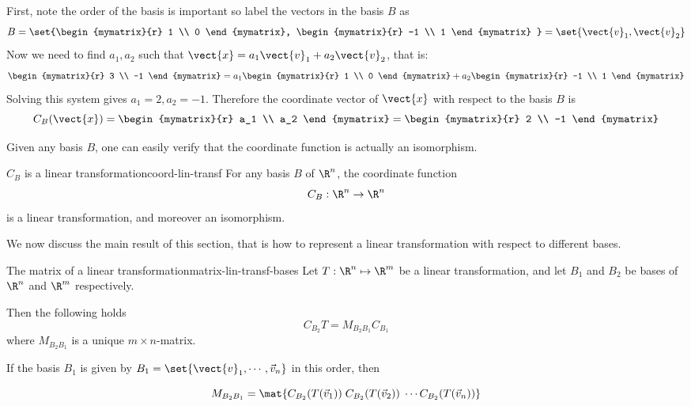 \begin{solution}
First, note the order of the basis is important so label the vectors in the basis $B$ as 
\[
B = \set{\begin{mymatrix}{r}
1 \\
0 
\end{mymatrix}, \begin{mymatrix}{r}
-1 \\
1
\end{mymatrix} } = \set{\vect{v}_1, \vect{v}_2 } \]
Now we need to find $a_1, a_2$ such that $\vect{x} = a_1 \vect{v}_1 + a_2 \vect{v}_2$, that is:
\[
\begin{mymatrix}{r}
3 \\
-1
\end{mymatrix}
=
a_1 
\begin{mymatrix}{r}
1 \\
0 
\end{mymatrix}
+ a_2
\begin{mymatrix}{r}
-1 \\
1 
\end{mymatrix}\]
Solving this system gives $a_1 = 2, a_2 = -1$. Therefore the coordinate vector of $\vect{x}$ with respect to the basis $B$ is 
\[
C_B(\vect{x})
=
\begin{mymatrix}{r}
a_1 \\
a_2 
\end{mymatrix}
= \begin{mymatrix}{r}
2 \\
-1 
\end{mymatrix}
\]
\end{solution}

Given any basis $B$, one can easily verify that the coordinate function is actually an isomorphism. 

\begin{theorem}{$C_B$ is a linear transformation}{coord-lin-transf}
For any basis $B$ of $\R^n$, the coordinate function
\[ C_B: \R^n  \rightarrow \R^n  \]
is a linear transformation, and moreover an isomorphism. 
\end{theorem}

We now discuss the main  result  of this section, that is how
to represent a linear transformation with respect to different
bases.

\begin{theorem}{The matrix of a linear transformation}{matrix-lin-transf-bases}
Let $T: \R^n \mapsto \R^m$ be a linear transformation,
and let $B_1$ and $B_2$ be bases of $\R^{n}$ and
$\R^{m}$ respectively.

Then the following holds
\begin{equation}
C_{B_2} T = M_{B_{2} B_{1}} C_{B_1}   \label{matrix-equation}
\end{equation}
where $M_{B_{2} B_{1}}$  is a unique $m \times n$-matrix.

If the basis $B_1$ is given by $B_1=\set{\vect{v}_1, \cdots, \vec{v}_n}$ in this order, then 

\[  M_{B_{2} B_{1}} = \mat{C_{B_2}(T(\vec{v}_1)) \; C_{B_2}(T(\vec{v}_2)) \; \cdots C_{B_2}(T(\vec{v}_n)) } \]
\end{theorem}

